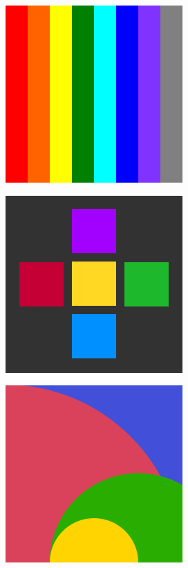 \documentclass[xcolor=dvipsnames, xetex,serif]{beamer}
\numberwithin{equation}{section}
\begin{document}
\begin{frame}
\begin{figure}[H]
\begin{subfigure}{0.3\linewidth}
					\includegraphics[width=0.7\linewidth]{images/image_inpaint_synthetic/case03-original.png}	
				\end{subfigure}
				\begin{subfigure}{0.3\linewidth}
					\centering
					\includegraphics[width=0.7\linewidth]{images/image_inpaint_synthetic/case04-original.png}
				\end{subfigure}
				\begin{subfigure}{0.3\linewidth}
					\centering
					\includegraphics[width=0.7\linewidth]{images/image_inpaint_synthetic/case05-original.png}	

\end{subfigure}
\end{figure}
\end{frame}
\end{document}
